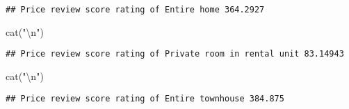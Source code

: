 \documentclass[
]{article}
\newenvironment{Shaded}{\begin{snugshade}}{\end{snugshade}}
\newcommand{\FunctionTok}[1]{\textcolor[rgb]{0.00,0.00,0.00}{#1}}
\newcommand{\NormalTok}[1]{#1}
\newcommand{\OtherTok}[1]{\textcolor[rgb]{0.56,0.35,0.01}{#1}}
\newcommand{\SpecialCharTok}[1]{\textcolor[rgb]{0.00,0.00,0.00}{#1}}
\newcommand{\StringTok}[1]{\textcolor[rgb]{0.31,0.60,0.02}{#1}}
\begin{document}
\begin{verbatim}
## Price review score rating of Entire home 364.2927
\end{verbatim}

\begin{Shaded}
\begin{Highlighting}[]
\FunctionTok{cat}\NormalTok{(}\StringTok{"}\SpecialCharTok{\textbackslash{}n}\StringTok{"}\NormalTok{)}
\end{Highlighting}
\end{Shaded}

\begin{Shaded}
\end{Shaded}

\begin{verbatim}
## Price review score rating of Private room in rental unit 83.14943
\end{verbatim}

\begin{Shaded}
\begin{Highlighting}[]
\FunctionTok{cat}\NormalTok{(}\StringTok{"}\SpecialCharTok{\textbackslash{}n}\StringTok{"}\NormalTok{)}
\end{Highlighting}
\end{Shaded}

\begin{Shaded}
\end{Shaded}

\begin{verbatim}
## Price review score rating of Entire townhouse 384.875
\end{verbatim}
\end{document}
